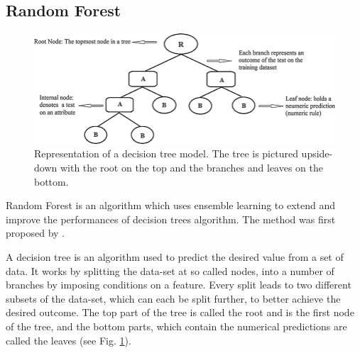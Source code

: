 \subsection{Random Forest}\label{random-forest}
\begin{figure}[!tp]
	\centering		  
	\includegraphics[width=1.\textwidth]{figures/decision_tree.png}
	\caption{Representation of a decision tree model. The tree is pictured upside-down with the root on the top and the branches and leaves on the bottom.}
	\label{fig:tree}
\end{figure}
Random Forest is an algorithm which uses ensemble learning to extend and improve the performances of decision trees algorithm. The method was first proposed by \citet{RandomHo1995}. 

A decision tree is an algorithm used to predict the desired value from a set of data. It works by splitting the data-set at so called nodes, into a number of branches by imposing conditions on a feature. Every split leads to two different subsets of the data-set, which can each be split further, to better achieve the desired outcome. The top part of the tree is called the root and is the first node of the tree, and the bottom parts, which contain the numerical predictions are called the leaves (see Fig. \ref{fig:tree}).

